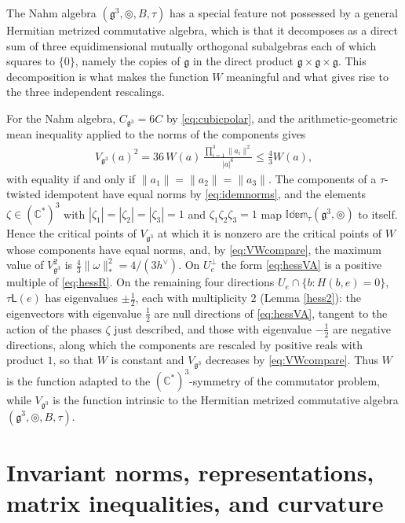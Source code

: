 \documentclass[leqno,10pt]{amsart}
\theoremstyle{definition}
\numberwithin{equation}{section}
\newcommand{\idem}{\mathbb{Idem}}
\newcommand{\tmlt}{\circledcirc}
\newcommand{\om}{\omega}
\newcommand{\lin}{\mathsf{L}}
\newcommand{\g}{\mathfrak{g}}
\newcommand{\com}{\mathbb C}
\newcommand{\hv}{h^\vee}
\newcommand{\norm}[1]{\lVert #1\rVert}
\newcommand{\nnorm}[1]{\lvert #1\rvert}%
\newcommand{\comass}[1]{\lVert #1\rVert_{\ast}}%
\newcommand{\Usp}{U}
\newcommand{\Uperp}{\Usp^{\perp}}
\begin{document}
The Nahm algebra $(\g^{3}, \tmlt, B, \tau)$ has a special feature not possessed by a general Hermitian metrized commutative algebra, which is that it decomposes as a direct sum of three equidimensional mutually orthogonal subalgebras each of which squares to $\{0\}$, namely the copies of $\g$ in the direct product $\g \times \g \times \g$. This decomposition is what makes the function $W$ meaningful and what gives rise to the three independent rescalings. 

For the Nahm algebra, $C_{\g^{3}} = 6C$ by \eqref{eq:cubicpolar}, and the arithmetic-geometric mean inequality applied to the norms of the components gives
\begin{align}\label{eq:VWcompare}
V_{\g^{3}}(a)^{2} = 36\,W(a)\,\frac{\prod_{i=1}^{3}\norm{a_{i}}^{2}}{\nnorm{a}^{6}} \leq \tfrac{4}{3}W(a),
\end{align}
with equality if and only if $\norm{a_{1}} = \norm{a_{2}} = \norm{a_{3}}$. The components of a $\tau$-twisted idempotent have equal norms by \eqref{eq:idemnorms}, and the elements $\zeta \in (\com^{\ast})^{3}$ with $|\zeta_{1}| = |\zeta_{2}| = |\zeta_{3}| = 1$ and $\zeta_{1}\zeta_{2}\zeta_{3} = 1$ map $\idem_{\tau}(\g^{3}, \tmlt)$ to itself. Hence the critical points of $V_{\g^{3}}$ at which it is nonzero are the critical points of $W$ whose components have equal norms, and, by \eqref{eq:VWcompare}, the maximum value of $V_{\g^{3}}^{2}$ is $\tfrac{4}{3}\comass{\om}^{2} = 4/(3\hv)$. On $\Uperp_{e}$ the form \eqref{eq:hessVA} is a positive multiple of \eqref{eq:hessR}. On the remaining four directions $\Usp_{e} \cap \{b: H(b, e) = 0\}$, $\tau\lin(e)$ has eigenvalues $\pm\tfrac{1}{2}$, each with multiplicity $2$ (Lemma \ref{hess2}): the eigenvectors with eigenvalue $\tfrac{1}{2}$ are null directions of \eqref{eq:hessVA}, tangent to the action of the phases $\zeta$ just described, and those with eigenvalue $-\tfrac{1}{2}$ are negative directions, along which the components are rescaled by positive reals with product $1$, so that $W$ is constant and $V_{\g^{3}}$ decreases by \eqref{eq:VWcompare}. Thus $W$ is the function adapted to the $(\com^{\ast})^{3}$-symmetry of the commutator problem, while $V_{\g^{3}}$ is the function intrinsic to the Hermitian metrized commutative algebra $(\g^{3}, \tmlt, B, \tau)$.

\section{Invariant norms, representations, matrix inequalities, and curvature}\label{sec:reductive}
\end{document}
